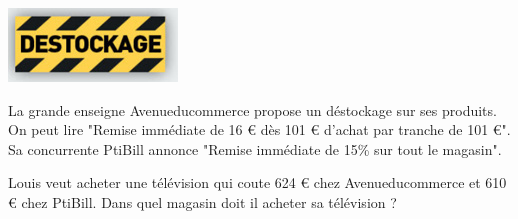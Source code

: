 

\begin{minipage}{5cm}

\includegraphics[scale=0.6]{destockage.jpg} 

\end{minipage}
\begin{minipage}{13cm}
La grande enseigne Avenueducommerce propose un déstockage sur ses produits. On peut lire "Remise immédiate de 16 \euro{} dès 101 \euro{} d'achat par tranche de 101 \euro{}".
Sa concurrente PtiBill annonce "Remise immédiate de 15\% sur tout le magasin".

Louis veut acheter une télévision qui coute 624 \euro{} chez Avenueducommerce et 610 \euro{} chez PtiBill. Dans quel magasin doit il acheter sa télévision ?

\end{minipage}




